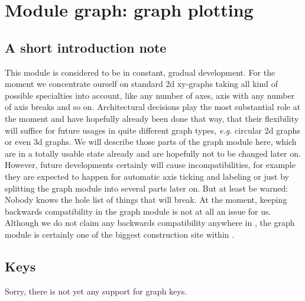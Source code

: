 \chapter{Module graph: graph plotting}
\label{graph}
\section{A short introduction note}
This module is considered to be in constant, gradual development. For
the moment we concentrate ourself on standard 2d xy-graphs taking all
kind of possible specialties into account, like any number of axes,
axis with any number of axis breaks and so on. Architectural decisions
play the most substantial role at the moment and have hopefully
already been done that way, that their flexibility will suffice for
future usages in quite different graph types, \emph{e.g.} circular 2d
graphs or even 3d graphs. We will describe those parts of the graph
module here, which are in a totally usable state already and are
hopefully not to be changed later on. However, future developments
certainly will cause incompatibilities, for example they are expected
to happen for automatic axis ticking and labeling or just by splitting
the graph module into several parts later on. But at least be warned:
Nobody knows the hole list of things that will break. At the moment,
keeping backwards compatibility in the graph module is not at all an
issue for us. Although we do not claim any backwards compatibility
anywhere in \PyX, the graph module is certainly one of the biggest
construction site within \PyX.
\section{Keys}
Sorry, there is not yet any support for graph keys.
